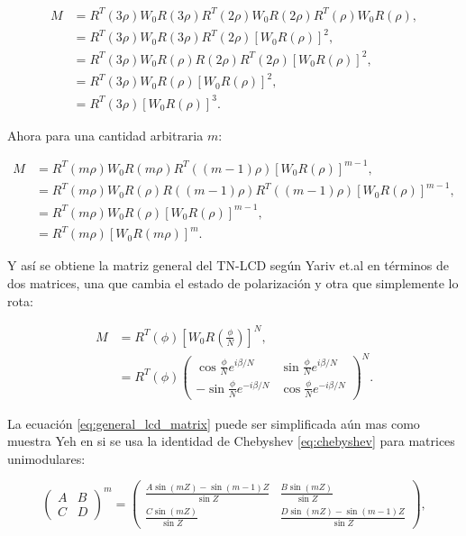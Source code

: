 \begin{align*}
  M &= R^T(3\rho)W_0R(3\rho)R^T(2\rho)W_0R(2\rho)R^T(\rho)W_0R(\rho),\\
      &=R^T(3\rho)W_0R(3\rho)R^T(2\rho)\left[W_0R(\rho)\right]^2,\\
      &=R^T(3\rho)W_0R(\rho)R(2\rho)R^T(2\rho)\left[W_0R(\rho)\right]^2,\\
      &=R^T(3\rho)W_0R(\rho)\left[W_0R(\rho)\right]^2,\\
      &=R^T(3\rho)\left[W_0R(\rho)\right]^3.
\end{align*}

Ahora para una cantidad arbitraria $m$:

\begin{align*}
  M &= R^T(m\rho)W_0R(m\rho)R^T((m-1)\rho)\left[W_0R(\rho)\right]^{m-1},\\
      &=R^T(m\rho)W_0R(\rho)R((m-1)\rho)R^T((m-1)\rho)\left[W_0R(\rho)\right]^{m-1},\\  
      &=R^T(m\rho)W_0R(\rho)\left[W_0R(\rho)\right]^{m-1},\\
      &=R^T(m\rho)\left[W_0R(m\rho)\right]^{m}.
\end{align*}


Y así se obtiene la matriz general del TN-LCD según Yariv et.al  en
términos de dos matrices, una que cambia el estado de polarización y
otra que simplemente lo rota: 

\begin{align}
M&=R^T\left( \phi\right)
\left[W_0R\left(\frac{\phi}{N}\right)\right]^N,\\
&=R^T\left( \phi\right)
\begin{pmatrix}
  \cos{\frac{\phi}{N}e^{i\beta/N}} &  \sin{\frac{\phi}{N}e^{i\beta/N}}\\
  -\sin{\frac{\phi}{N}e^{-i\beta/N}} &  \cos{\frac{\phi}{N}e^{-i\beta/N}}  
\end{pmatrix}^N.
\label{eq:general_lcd_matrix}
\end{align}

La ecuación \ref{eq:general_lcd_matrix} puede ser simplificada aún
mas como muestra Yeh en  si se usa la identidad de Chebyshev
\ref{eq:chebyshev} para matrices unimodulares:  

\begin{equation}
  \begin{pmatrix}
    A & B \\ C & D
  \end{pmatrix}^m
=
\begin{pmatrix}
  \frac{A\sin{ (mZ) }-\sin(m-1)Z }{\sin{Z} }
  &\frac{B\sin{(mZ)}}{\sin{Z}}\\
\frac{C\sin{(mZ)}}{\sin{Z}}&   \frac{D\sin{ (mZ) }-\sin(m-1)Z }{\sin{Z} }
\end{pmatrix},
  \label{eq:chebyshev}
\end{equation}

